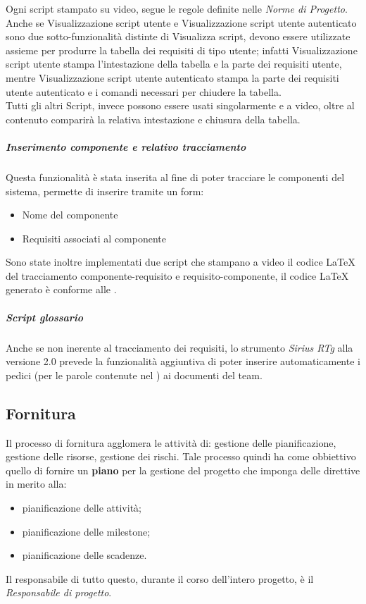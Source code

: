 Ogni script stampato su video, segue le regole definite nelle \textit{Norme di Progetto}.\\
Anche se Visualizzazione script utente e Visualizzazione script utente autenticato sono due sotto-funzionalità distinte di Visualizza script, devono essere utilizzate assieme per produrre la tabella dei requisiti di tipo utente; infatti Visualizzazione script utente stampa l'intestazione della tabella e la parte dei requisiti utente, mentre Visualizzazione script utente autenticato stampa la parte dei requisiti utente autenticato e i comandi necessari per chiudere la tabella.\\
Tutti gli altri Script, invece possono essere usati singolarmente e a video, oltre al contenuto comparirà la relativa intestazione e chiusura della tabella.
\subparagraph{Inserimento componente e relativo tracciamento}
Questa funzionalità è stata inserita al fine di poter tracciare le componenti del sistema, permette di inserire tramite un form:
\begin{itemize}
\item Nome del componente
\item Requisiti associati al componente
\end{itemize}
Sono state inoltre implementati due script che stampano a video il codice \LaTeX{} del tracciamento componente-requisito e requisito-componente, il codice \LaTeX{} generato è conforme alle \NormeDiProgetto{}.
\subparagraph{Script glossario}
Anche se non inerente al tracciamento dei requisiti, lo strumento \textit{Sirius RTg} alla versione 2.0 prevede la funzionalità aggiuntiva di poter inserire automaticamente i pedici  (per le parole contenute nel \Glossario{}) ai documenti del team.
\subsection{Fornitura}
Il processo di fornitura agglomera le attività di: gestione delle pianificazione, gestione delle risorse, gestione dei rischi.
Tale processo quindi ha come obbiettivo quello di fornire un\textbf{ piano} per la gestione del progetto che imponga delle direttive in merito alla:
\begin{itemize}
\item pianificazione delle attività;
\item pianificazione delle milestone;
\item pianificazione delle scadenze.
\end{itemize}
Il responsabile di tutto questo, durante il corso dell'intero progetto, è il \textit{Responsabile di progetto}.


